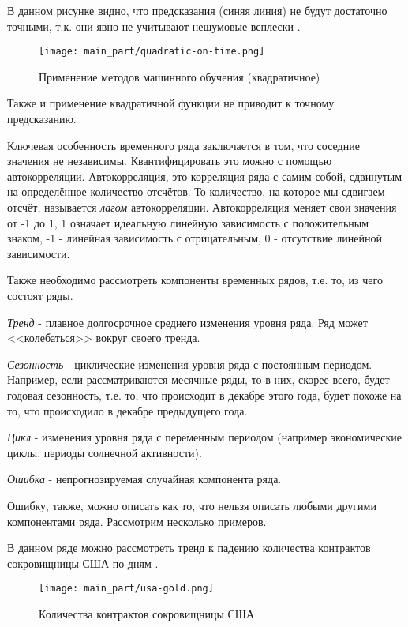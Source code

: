В данном рисунке видно, что предсказания (синяя линия) не будут достаточно точными, т.к. они явно не учитывают нешумовые всплески \cite{datamining_in_action}.

\begin{figure}[h]
\centering
	\texttt{[image: main\_part/quadratic-on-time.png]}
	\caption{Применение методов машинного обучения (квадратичное)}
	\label{sec:purpose:quadratic}
\end{figure}

Также и применение квадратичной функции не приводит к точному предсказанию.

Ключевая особенность временного ряда заключается в том, что соседние значения не независимы. Квантифицировать это можно с помощью автокорреляции. Автокорреляция, это корреляция ряда с самим собой, сдвинутым на определённое количество отсчётов. То количество, на которое мы сдвигаем отсчёт, называется \textit{лагом} автокорреляции. Автокорреляция меняет свои значения от -1 до 1, 1 означает идеальную линейную зависимость с положительным знаком, -1 - линейная зависимость с отрицательным, 0 - отсутствие линейной зависимости.

Также необходимо рассмотреть компоненты временных рядов, т.е. то, из чего состоят ряды.

\textit{Тренд} - плавное долгосрочное среднего изменения уровня ряда. Ряд может <<колебаться>> вокруг своего тренда.

\textit{Сезонность} - циклические изменения уровня ряда с постоянным периодом. Например, если рассматриваются месячные ряды, то в них, скорее всего, будет годовая сезонность, т.е. то, что происходит в декабре этого года, будет похоже на то, что происходило в декабре предыдущего года.

\textit{Цикл} - изменения уровня ряда с переменным периодом (например экономические циклы, периоды солнечной активности).

\textit{Ошибка} - непрогнозируемая случайная компонента ряда.

Ошибку, также, можно описать как то, что нельзя описать любыми другими компонентами ряда. Рассмотрим несколько примеров.

В данном ряде можно рассмотреть тренд к падению количества контрактов сокровищницы США по дням \cite{datamining_in_action}.

\begin{figure}[h]
\centering
	\texttt{[image: main\_part/usa-gold.png]}
	\caption{Количества контрактов сокровищницы США}
	\label{sec:purpose:contracts}
\end{figure}

